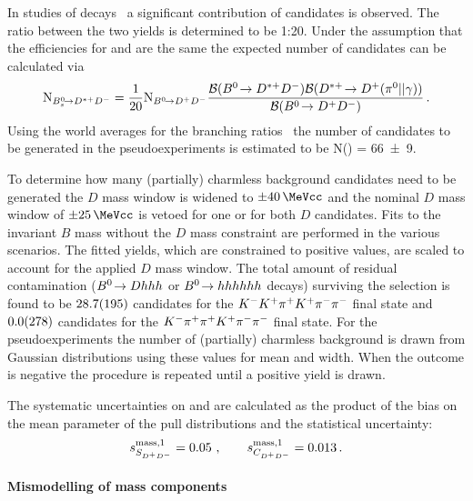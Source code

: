 In studies of \BdToDstD decays~\cite{BToDstDthesis} a significant contribution
of \BsToDstD candidates is observed. The ratio between the two yields is
determined to be 1:20. Under the assumption that the efficiencies for \BToDD
and \BToDstD are the same the expected number of \BsToDstD candidates can be
calculated via
\begin{align}
	\text{N}_{{{B}^0_{s}}\!\rightarrow {\ensuremath{{D}^{*+}}}{\ensuremath{{D}^-}}} = \frac{1}{20} \text{N}_{{{B}^0}\!\rightarrow {\ensuremath{{D}^+}}{\ensuremath{{D}^-}}} \frac{\mathcal{B}({{B}^0}\!\rightarrow {\ensuremath{{D}^{*+}}}{\ensuremath{{D}^-}}) \mathcal{B}({{D}^{*+}} \!\rightarrow {\ensuremath{{D}^+}} ({{\pi}^0} || \gamma))}{\mathcal{B}({{B}^0}\!\rightarrow {\ensuremath{{D}^+}}{\ensuremath{{D}^-}})} \,.
\end{align}
Using the world averages for the branching ratios~\cite{PDG2014} the number of
candidates to be generated in the pseudoexperiments is estimated to be
N(\BsToDstD) = \num{66\pm9}.

To determine how many (partially) charmless background candidates need to be
generated the $D$ mass window is widened to $\SI{\pm40}{\MeVcc}$ and the
nominal $D$ mass window of $\SI{\pm25}{\MeVcc}$ is vetoed for one or for both
$D$ candidates. Fits to the invariant $B$ mass without the $D$ mass constraint
are performed in the various scenarios. %
%
The fitted yields, which are constrained to positive values, are scaled to
account for the applied $D$ mass window. The total amount of residual
contamination (${{B}^0}\!\rightarrow D hhh$ or ${{B}^0}\!\rightarrow hhhhhh$ decays) surviving the
\BdToDD selection is found to be $\num{28.7\pm19.5}$ candidates for the
${{K}^-}{{K}^+}{{\pi}^+}{{K}^+}{{\pi}^-}{{\pi}^-}$ final state and $\num{0.0\pm27.8}$ candidates for the
${{K}^-}{{\pi}^+}{{\pi}^+}{{K}^+}{{\pi}^-}{{\pi}^-}$ final state. For the pseudoexperiments the number of (partially)
charmless background is drawn from Gaussian distributions using these values
for mean and width. When the outcome is negative the procedure is repeated
until a positive yield is drawn.

The systematic uncertainties on \SDD and \CDD are calculated as the product of
the bias on the mean parameter of the pull distributions and the statistical
uncertainty:
\begin{align*}
s_{S_{{{D}^+}{{D}^-}}}^{\text{mass,1}} = \num{0.05}\ , \qquad s_{C_{{{D}^+}{{D}^-}}}^{\text{mass,1}} = \num{0.013}\,.
\end{align*}

\paragraph{Mismodelling of mass components}

